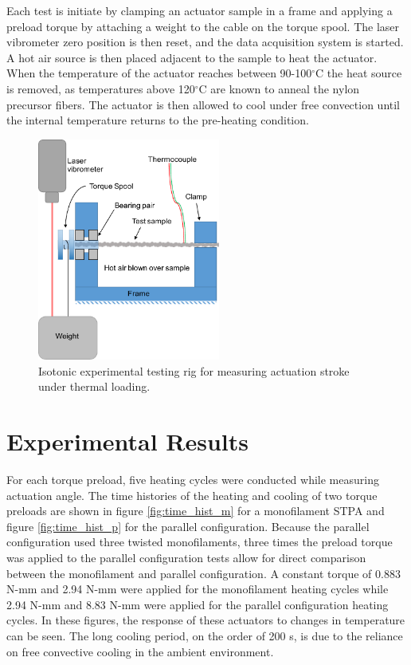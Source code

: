 \documentclass[twocolumn,10pt]{asme2e}
\begin{document}
Each test is initiate by clamping an actuator sample in a frame and applying a preload torque by attaching a weight to the cable on the torque spool. The laser vibrometer zero position is then reset, and the data acquisition system is started. A hot air source is then placed adjacent to the sample to heat the actuator. When the temperature of the actuator reaches between 90-100$^\circ$C the heat source is removed, as temperatures above 120$^\circ$C are known to anneal the nylon precursor fibers. The actuator is then allowed to cool under free convection until the internal temperature returns to the pre-heating condition. 


\begin{figure}
    \centering
        \includegraphics[width=6cm]{../Images/experimental_setup.pdf}
        \caption{Isotonic experimental testing rig for measuring actuation stroke under thermal loading.}
        \label{fig:setup}
\end{figure}

\section{Experimental Results}
For each torque preload, five heating cycles were conducted while measuring actuation angle. The time histories of the heating and cooling of two torque preloads are shown in figure \ref{fig:time_hist_m} for a monofilament STPA and figure \ref{fig:time_hist_p} for the parallel configuration. Because the parallel configuration used three twisted monofilaments, three times the preload torque was applied to the parallel configuration tests allow for direct comparison between the monofilament and parallel configuration. A constant torque of 0.883 N-mm and 2.94 N-mm were applied for the monofilament heating cycles while 2.94 N-mm and 8.83 N-mm were applied for the parallel configuration heating cycles. In these figures, the response of these actuators to changes in temperature can be seen. The long cooling period, on the order of 200 s, is due to the reliance on free convective cooling in the ambient environment.
\end{document}
